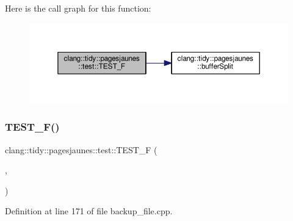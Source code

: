 Here is the call graph for this function\+:
\nopagebreak
\begin{figure}[H]
\begin{center}
\leavevmode
\includegraphics[width=350pt]{namespaceclang_1_1tidy_1_1pagesjaunes_1_1test_a35ad2a928b471ce291df19fb21480d8e_cgraph}
\end{center}
\end{figure}
\mbox{\label{namespaceclang_1_1tidy_1_1pagesjaunes_1_1test_af47e8983ad0de8365930dbc09f15f6d0}} 
\subsubsection{\texorpdfstring{T\+E\+S\+T\+\_\+\+F()}{TEST\_F()}\hspace{0.1cm}{\footnotesize\ttfamily [40/57]}}
{\footnotesize\ttfamily clang\+::tidy\+::pagesjaunes\+::test\+::\+T\+E\+S\+T\+\_\+F (\begin{DoxyParamCaption}\item[{\hyperlink{classclang_1_1tidy_1_1pagesjaunes_1_1test_1_1_backup_file}{Backup\+File}}]{,  }\item[{Simple\+Backup1}]{ }\end{DoxyParamCaption})}



Definition at line 171 of file backup\+\_\+file.\+cpp.

